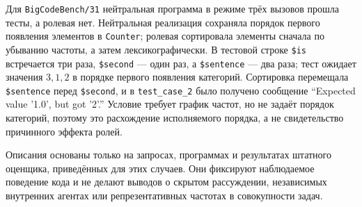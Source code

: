 Для \texttt{BigCodeBench/31} нейтральная программа в режиме трёх вызовов прошла тесты, а ролевая нет. Нейтральная реализация сохраняла порядок первого появления элементов в \texttt{Counter}; ролевая сортировала элементы сначала по убыванию частоты, а затем лексикографически. В тестовой строке \texttt{\$is} встречается три раза, \texttt{\$second} --- один раз, а \texttt{\$sentence} --- два раза; тест ожидает значения $3,1,2$ в порядке первого появления категорий. Сортировка перемещала \texttt{\$sentence} перед \texttt{\$second}, и в \texttt{test\_case\_2} было получено сообщение ``Expected value '1.0', but got '2'.'' Условие требует график частот, но не задаёт порядок категорий, поэтому это расхождение исполняемого порядка, а не свидетельство причинного эффекта ролей.

Описания основаны только на запросах, программах и результатах штатного оценщика, приведённых для этих случаев. Они фиксируют наблюдаемое поведение кода и не делают выводов о скрытом рассуждении, независимых внутренних агентах или репрезентативных частотах в совокупности задач.
